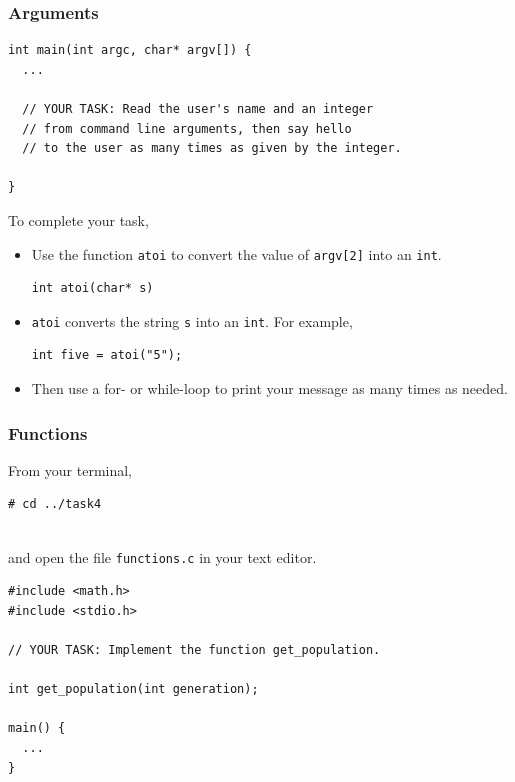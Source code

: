 \documentclass[pdf]{beamer}
\begin{document}
\begin{frame}[fragile]
  \frametitle{Arguments}
\begin{verbatim}
int main(int argc, char* argv[]) {
  ...

  // YOUR TASK: Read the user's name and an integer
  // from command line arguments, then say hello
  // to the user as many times as given by the integer.

}

\end{verbatim}

\bigskip

To complete your task,

  \begin{itemize}
  \item Use the function \texttt{atoi} to convert the value of
    \texttt{argv[2]} into an \texttt{int}.
\begin{verbatim}
int atoi(char* s)
\end{verbatim}
    \pause
  \item \texttt{atoi} converts the string \texttt{s} into an
    \texttt{int}. For example,
\begin{verbatim}
int five = atoi("5");
\end{verbatim}
    \pause
  \item Then use a for- or while-loop to print your message as many times as needed.
  \end{itemize}

\end{frame}

\begin{frame}
  \frametitle{Functions}

  From your terminal,
\begin{verbatim}
# cd ../task4
\end{verbatim}
  \\
  and open the file \texttt{functions.c} in your text editor.
  \pause

  \bigskip

\begin{verbatim}
#include <math.h>
#include <stdio.h>

// YOUR TASK: Implement the function get_population.

int get_population(int generation);

main() {
  ...
}
\end{verbatim}
\end{frame}
\end{document}
